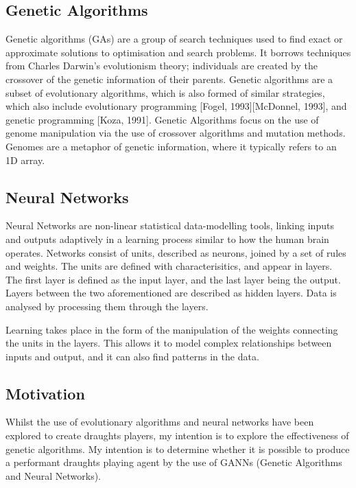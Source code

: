 \documentclass[12pt,a4paper]{article}
\begin{document}
\subsection*{Genetic Algorithms}

    Genetic algorithms (GAs) are a group of search techniques used to find exact or approximate solutions to optimisation and search problems. It borrows techniques from Charles Darwin's evolutionism theory; individuals are created by the crossover of the genetic information of their parents. 
    Genetic algorithms are a subset of evolutionary algorithms, which is also formed of similar strategies, which also include evolutionary programming [Fogel, 1993][McDonnel, 1993], and genetic programming [Koza, 1991]. Genetic Algorithms focus on the use of genome manipulation via the use of crossover algorithms and mutation methods. Genomes are a metaphor of genetic information, where it typically refers to an 1D array.

\subsection*{Neural Networks}

    Neural Networks are non-linear statistical data-modelling tools, linking inputs and outputs adaptively in a learning process similar to how the human brain operates. Networks consist of units, described as neurons, joined by a set of rules and weights. The units are defined with characterisitics, and appear in layers. The first layer is defined as the input layer, and the last layer being the output. Layers between the two aforementioned are described as hidden layers. Data is analysed by processing them through the layers.

    Learning takes place in the form of the manipulation of the weights connecting the units in the layers. This allows it to model complex relationships between inputs and output, and it can also find patterns in the data. 

\subsection*{Motivation}
    Whilst the use of evolutionary algorithms and neural networks have been explored to create draughts players, my intention is to explore the effectiveness of genetic algorithms. My intention is to determine whether it is possible to  produce a performant draughts playing agent by the use of GANNs (Genetic Algorithms and Neural Networks). 
\end{document}
